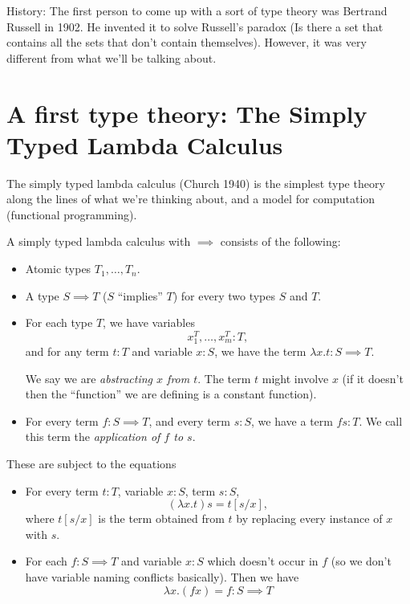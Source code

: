 \documentclass{article}
\begin{document}
History: The first person to come up with a sort of type
theory was Bertrand Russell in 1902. He invented it to solve
Russell's paradox (Is there a set that contains all the sets 
that don't contain themselves). However, 
it was very different from
what we'll be talking about.

\section{A first type theory: The Simply Typed Lambda Calculus}

The simply typed lambda calculus (Church 1940) is the simplest
type theory along the lines of what we're thinking about,
and a model for computation (functional programming).

\begin{definition}
    A simply typed lambda calculus with $\implies$ consists of 
    the following:
    \begin{itemize}
        \item Atomic types $T_1,\ldots,T_n$.
        \item A type $S\implies T$ ($S$ ``implies'' $T$) for 
            every two types $S$ and $T$.
        \item For each type $T$, we have variables 
            \[ x_1^T,\ldots, x_m^T : T, \]
            and for any term $t:T$ and variable $x:S$, we have
            the term $\lambda x.t : S\implies T$.

            We say we are \emph{abstracting $x$ from $t$}.
            The term 
            $t$ might involve $x$ (if it doesn't then the 
            ``function'' we are defining is a constant
            function).
        \item For every term $f:S\implies T$, and every term 
            $s:S$, we have a term $fs : T$.
            We call this term the \emph{application of $f$ to $s$}.
    \end{itemize}
    These are subject to the equations 
    \begin{itemize}
        \item For every term $t:T$, variable $x:S$, term $s:S$,
            \[ (\lambda x.t)s = t[s/x], \]
            where $t[s/x]$ is the term obtained from 
            $t$ by replacing every instance
            of $x$ with $s$.
        \item For each $f:S\implies T$ and variable $x:S$
            which doesn't occur in $f$ (so we don't have variable
            naming conflicts basically). Then we have 
            \[ \lambda x.(fx) = f : S\implies T \]
    \end{itemize}

\end{definition}
\end{document}
